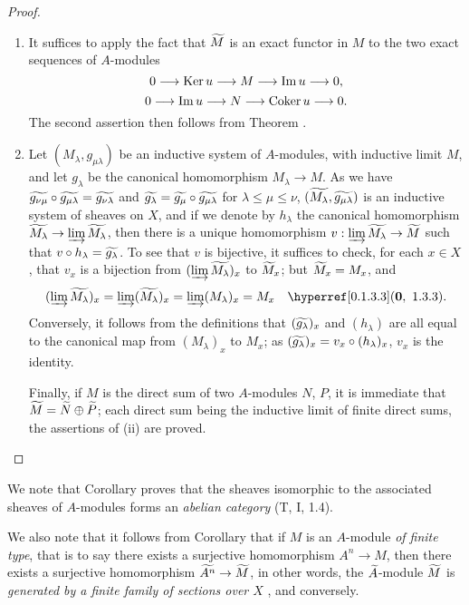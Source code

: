 \begin{proof}
\label{proof-1.1.3.9}
\medskip\noindent
\begin{enumerate}[label=(\roman*)]
  \item It suffices to apply the fact that $\widetilde{M}$ is an exact functor in $M$  to the two exact sequences of $A$-modules
    \[
      0\longrightarrow{\mathop{\mathrm{Ker}}\nolimits}\, u\longrightarrow M\longrightarrow{\mathop{\mathrm{Im}}\nolimits}\, u\longrightarrow 0,
    \]
    \[
      0\longrightarrow{\mathop{\mathrm{Im}}\nolimits}\, u\longrightarrow N\longrightarrow{\mathop{\mathrm{Coker}}\nolimits}\, u\longrightarrow 0.
    \]
    The second assertion then follows from Theorem .
  \item Let $(M_\lambda,g_{\mu\lambda})$ be an inductive system of $A$-modules, with inductive limit $M$, and let $g_\lambda$ be the canonical homomorphism $M_\lambda\to M$.
    As we have $\widetilde{g_{\nu\mu}}\circ\widetilde{g_{\mu\lambda}}=\widetilde{g_{\nu\lambda}}$ and $\widetilde{g_\lambda}=\widetilde{g_\mu}\circ\widetilde{g_{\mu\lambda}}$ for $\lambda\leqslant\mu\leqslant\nu$, $(\widetilde{M_\lambda},\widetilde{g_{\mu\lambda}})$ is an inductive system of sheaves on $X$, and if we denote by $h_\lambda$ the canonical homomorphism $\widetilde{M_\lambda}\to\varinjlim\widetilde{M_\lambda}$, then there is a unique homomorphism $v:\varinjlim\widetilde{M_\lambda}\to\widetilde{M}$ such that $v\circ h_\lambda=\widetilde{g_\lambda}$.
    To see that $v$ is bijective, it suffices to check, for each $x\in X$, that $v_x$ is a bijection from $(\varinjlim\widetilde{M_\lambda})_x$ to $\widetilde{M}_x$; but $\widetilde{M}_x=M_x$, and
    \[
      (\varinjlim\wt{M_\lambda})_x=\varinjlim(\wt{M_\lambda})_x
      =\varinjlim(M_\lambda)_x=M_x\quad\sref[0]{0.1.3.3}.
    \]
    Conversely, it follows from the definitions that $(\widetilde{g_\lambda})_x$ and
    $(h_\lambda)$ are all equal to the canonical map from $(M_\lambda)_x$ to $M_x$; as
    $(\widetilde{g_\lambda})_x=v_x\circ(h_\lambda)_x$, $v_x$ is the identity.

    Finally, if $M$ is the direct sum of two $A$-modules $N$, $P$, it is immediate that $\widetilde{M}=\widetilde{N}\oplus\widetilde{P}$; each direct sum being the inductive limit of finite direct sums, the assertions of (ii) are proved.
\end{enumerate}
\end{proof}

We note that Corollary  proves that the sheaves isomorphic to the associated sheaves
of $A$-modules forms an \emph{abelian category} (T, I, 1.4).

We also note that it follows from Corollary  that if $M$ is an $A$-module \emph{of
finite type}, that is to say there exists a surjective homomorphism $A^n\to M$, then there
exists a surjective homomorphism $\widetilde{A^n}\to\widetilde{M}$, in other words, the
$\widetilde{A}$-module $\widetilde{M}$ is \emph{generated by a finite family of sections over
$X$} , and conversely.

